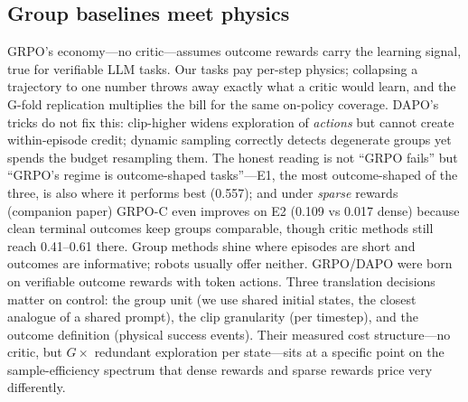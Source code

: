 \documentclass[journal,twoside]{IEEEtran}
\newcommand{\grpo}{\textsc{GRPO-C}}
\begin{document}
\subsection{Group baselines meet physics}
GRPO's economy---no critic---assumes outcome rewards carry the learning
signal, true for verifiable LLM tasks. Our tasks pay per-step physics;
collapsing a trajectory to one number throws away exactly what a critic
would learn, and the G-fold replication multiplies the bill for the same
on-policy coverage. DAPO's tricks do not fix this: clip-higher widens
exploration of \emph{actions} but cannot create within-episode credit;
dynamic sampling correctly detects degenerate groups yet spends the budget
resampling them. The honest reading is not ``GRPO fails'' but ``GRPO's
regime is outcome-shaped tasks''---E1, the most outcome-shaped of the
three, is also where it performs best (0.557); and under \emph{sparse}
rewards (companion paper) \grpo{} even improves on E2 (0.109 vs 0.017
dense) because clean terminal outcomes keep groups comparable, though
critic methods still reach 0.41--0.61 there. Group methods shine where episodes are short and
outcomes are informative; robots usually offer neither.
GRPO/DAPO were born on verifiable outcome rewards with token actions.
Three translation decisions matter on control: the group unit (we use
shared initial states, the closest analogue of a shared prompt), the clip
granularity (per timestep), and the outcome definition (physical success
events). Their measured cost structure---no critic, but $G\times$ redundant
exploration per state---sits at a specific point on the sample-efficiency
spectrum that dense rewards and sparse rewards price very differently.
\end{document}
